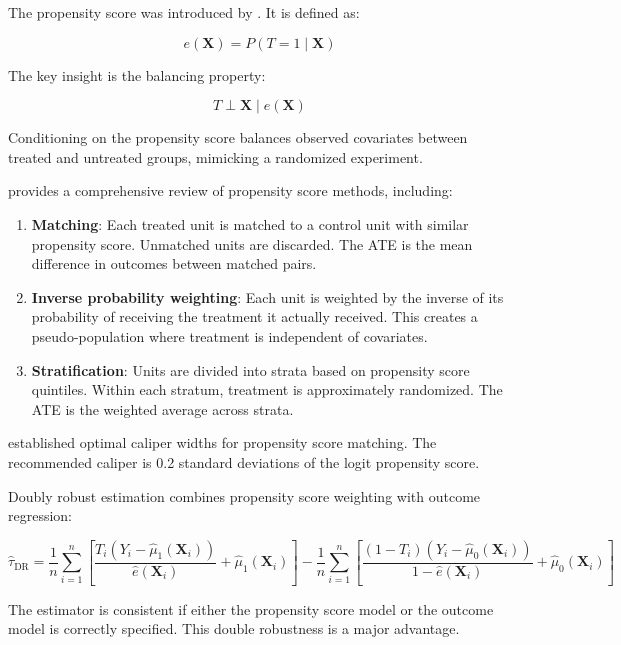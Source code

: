 The propensity score was introduced by \citet{rosenbaum1983central}. It is defined as:

\[
e(\mathbf{X}) = P(T = 1 \mid \mathbf{X})
\]

The key insight is the balancing property:

\[
T \perp \mathbf{X} \mid e(\mathbf{X})
\]

Conditioning on the propensity score balances observed covariates between treated and untreated groups, mimicking a randomized experiment.

\citet{austin2011introduction} provides a comprehensive review of propensity score methods, including:

\begin{enumerate}
	\item \textbf{Matching}: Each treated unit is matched to a control unit with similar propensity score. Unmatched units are discarded. The ATE is the mean difference in outcomes between matched pairs.
	
	\item \textbf{Inverse probability weighting}: Each unit is weighted by the inverse of its probability of receiving the treatment it actually received. This creates a pseudo-population where treatment is independent of covariates.
	
	\item \textbf{Stratification}: Units are divided into strata based on propensity score quintiles. Within each stratum, treatment is approximately randomized. The ATE is the weighted average across strata.
\end{enumerate}

\citet{austin2010optimal} established optimal caliper widths for propensity score matching. The recommended caliper is 0.2 standard deviations of the logit propensity score.

Doubly robust estimation \citep{schafer2008average} combines propensity score weighting with outcome regression:

\[
\hat{\tau}_{\text{DR}} = \frac{1}{n}\sum_{i=1}^{n}\left[\frac{T_i(Y_i - \hat{\mu}_1(\mathbf{X}_i))}{\hat{e}(\mathbf{X}_i)} + \hat{\mu}_1(\mathbf{X}_i)\right] - \frac{1}{n}\sum_{i=1}^{n}\left[\frac{(1-T_i)(Y_i - \hat{\mu}_0(\mathbf{X}_i))}{1 - \hat{e}(\mathbf{X}_i)} + \hat{\mu}_0(\mathbf{X}_i)\right]
\]

The estimator is consistent if either the propensity score model or the outcome model is correctly specified. This double robustness is a major advantage.

